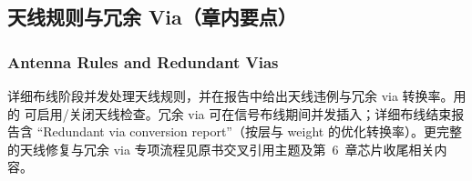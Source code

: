 \subsection{天线规则与冗余 Via（章内要点）}
\subsubsection*{Antenna Rules and Redundant Vias}

详细布线阶段并发处理天线规则，并在报告中给出天线违例与冗余 via 转换率。用  的  可启用/关闭天线检查。冗余 via 可在信号布线期间并发插入；详细布线结束报告含 ``Redundant via conversion report''（按层与 weight 的优化转换率）。更完整的天线修复与冗余 via 专项流程见原书交叉引用主题及第~6~章芯片收尾相关内容。
